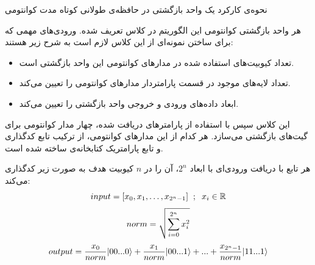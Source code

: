 \begin{algorithm}[t]
\caption{نحوه‌ی کارکرد یک واحد بازگشتی در حافظه‌ی طولانی کوتاه مدت کوانتومی} \label{alg:qlstmcell}
\end{algorithm}

هر واحد بازگشتی کوانتومی این الگوریتم در کلاس
تعریف شده.
ورودی‌های مهمی که برای ساختن نمونه‌ای از این کلاس لازم است به شرح زیر هستند:
\begin{itemize}
    \item 
    تعداد کیوبیت‌های استفاده شده در مدارهای کوانتومی این واحد بازگشتی است.
    \item
    تعداد لایه‌های موجود در قسمت پارامتردار مدارهای کوانتومی را تعیین می‌کند.
    \item
    ابعاد داده‌های ورودی و خروجی واحد بازگشتی را تعیین می‌کند.
\end{itemize}

این کلاس سپس با استفاده از پارامترهای دریافت شده، چهار مدار کوانتومی برای گیت‌های بازگشتی می‌سازد.
هر کدام از این مدارهای کوانتومی، از ترکیب تابع کدگذاری
و تابع پارامتریک
کتابخانه‌ی
ساخته شده است.

هر تابع
با دریافت ورودی‌ای با ابعاد
$2^n$،
آن را در 
$n$
کیوبیت هدف به صورت زیر کدگذاری می‌کند:
\begin{equation} \label{eqn:midi_data}
    \begin{gathered}
       input = [x_0, x_1, \dots, x_{2^n-1}] \hspace{2mm} ; \hspace{2mm} x_i \in \mathbb{R} \\[3pt]
       norm = \sqrt{\sum^{2^n}_{i=0} x_i^2 } \\[3pt]
       output = \frac{x_0}{norm} |00...0\rangle + \frac{x_1}{norm} |00...1\rangle + ... + \frac{x_{2^n-1}}{norm} |11...1\rangle
    \end{gathered}
\end{equation}

